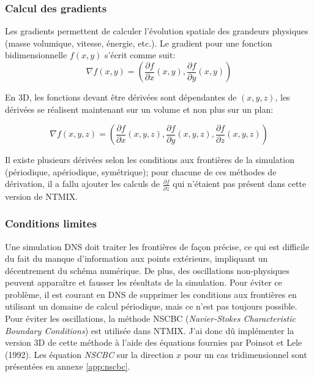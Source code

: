
\subsubsection{Calcul des gradients}%

Les gradients permettent de calculer l'évolution spatiale des grandeurs physiques (masse volumique, vitesse, énergie, etc.). Le gradient pour une fonction bidimensionnelle $f(x,y)$ s'écrit comme suit:
$$\nabla f(x,y) =\left(\frac{\partial f}{\partial x}(x,y),\frac{\partial f}{\partial y}(x,y)\right) $$

En 3D, les fonctions devant être dérivées sont dépendantes de $(x,y,z)$, les dérivées se réalisent maintenant sur un volume et non plus sur un plan:

$$ \nabla f(x,y,z) =\left(\frac{\partial f}{\partial x}(x,y,z),\frac{\partial f}{\partial y}(x,y,z),\frac{\partial f}{\partial z}(x,y,z)\right)$$


Il existe plusieurs dérivées selon les conditions aux frontières de la simulation (périodique, apériodique, symétrique); pour chacune de ces méthodes de dérivation, il a fallu ajouter les calculs de $\frac{\partial f}{\partial z}$ qui n'étaient pas présent dans cette version de NTMIX.




\subsubsection{Conditions limites}\label{sec:nsbc}
Une simulation DNS doit traiter les frontières de façon précise, ce qui est difficile du fait du manque d'information aux points extérieurs, impliquant un décentrement du schéma numérique. De plus, des oscillations non-physiques peuvent apparaître et fausser les résultats de la simulation. Pour éviter ce problème, il est courant en DNS de supprimer les conditions aux frontières en utilisant un domaine de calcul périodique, mais ce n'est pas toujours possible. Pour éviter les oscillations, la méthode NSCBC (\textit{Navier-Stokes Characteristic Boundary Conditions}) est utilisée dans NTMIX. J'ai donc dû implémenter la version 3D de cette méthode à l'aide des équations fournies par Poinsot et Lele (1992)\cite{POINSOT1992104}. Les équation \textit{NSCBC} sur la direction $x$ pour un cas tridimensionnel sont présentées en annexe \ref{app:nscbc}. 
\cite{baritaud1996direct}


